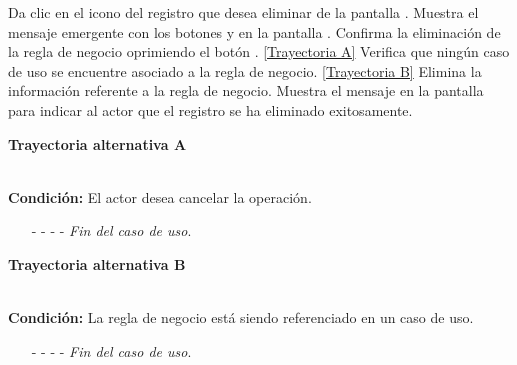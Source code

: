 	\begin{UCtrayectoria}
		\UCpaso[\UCactor] Da clic en el icono \eliminar del registro que desea eliminar de la pantalla .
		\UCpaso[\UCsist] Muestra el mensaje emergente  con los botones  y  en la pantalla .
		\UCpaso[\UCactor] Confirma la eliminación de la regla de negocio oprimiendo el botón . \hyperlink{CU8-3:TAA}{[Trayectoria A]}
		\UCpaso[\UCsist] Verifica que ningún caso de uso se encuentre asociado a la regla de negocio. \hyperlink{CU8-3:TAB}{[Trayectoria B]}
		\UCpaso[\UCsist] Elimina la información referente a la regla de negocio.
		\UCpaso[\UCsist] Muestra el mensaje  en la pantalla  para indicar al actor que el registro se ha eliminado exitosamente.
	\end{UCtrayectoria}	

\hypertarget{CU8-3:TAA}{\textbf{Trayectoria alternativa A}}\\
\noindent \textbf{Condición:} El actor desea cancelar la operación.
\begin{enumerate}
	\UCpaso[\UCactor] Solicita cancelar la operación oprimiendo el botón  del mensaje emergente.
	\UCpaso[\UCsist] Muestra la pantalla .
	\item[- -] - - {\em {Fin del caso de uso}}.%
\end{enumerate}	
\hypertarget{CU8-3:TAB}{\textbf{Trayectoria alternativa B}}\\
\noindent \textbf{Condición:} La regla de negocio está siendo referenciado en un caso de uso.
\begin{enumerate}
	\UCpaso[\UCsist] Muestra el mensaje  en la pantalla .
	\item[- -] - - {\em {Fin del caso de uso}}.%
\end{enumerate}
	

